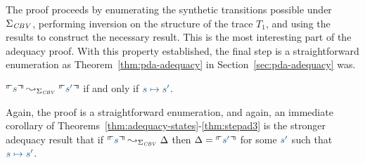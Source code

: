 







\noindent
The proof proceeds by enumerating the synthetic transitions
possible under $\Sigma_{\it CBV}$, performing inversion on the 
structure of the trace $T_1$, and using the results to construct
the necessary result.
This is the most interesting part of the adequacy proof.
With this property established, the
final step is a straightforward enumeration as Theorem~\ref{thm:pda-adequacy}
in Section~\ref{sec:pda-adequacy} was.

\bigskip
\begin{theorem}\label{thm:stepad3}
$\ctxinterp{s} \leadsto_{\Sigma_{\it CBV}} \ctxinterp{s'}$
if and only if $\obj{s \mapsto s'}$.
\end{theorem}
\bigskip

\noindent
Again, the proof is a straightforward enumeration, and again, an
immediate corollary of Theorems~\ref{thm:adequacy-states}-\ref{thm:stepad3}
is the stronger adequacy result that 
if $\ctxinterp{s} \leadsto_{\Sigma_{\it CBV}} \Delta$
then $\Delta = \ctxinterp{s'}$ for some $\obj{s'}$ such that 
$\obj{s \mapsto s'}$.


